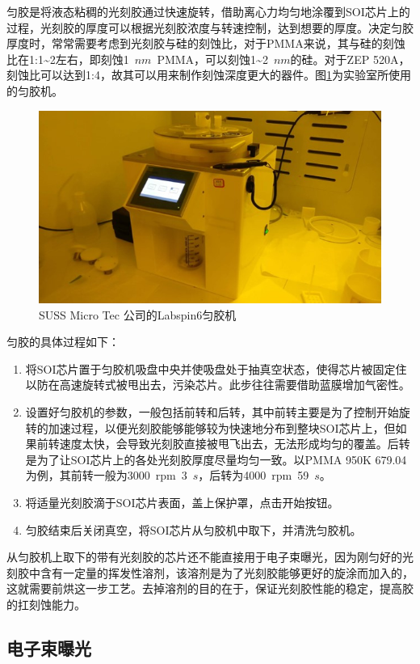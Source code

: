 匀胶是将液态粘稠的光刻胶通过快速旋转，借助离心力均匀地涂覆到SOI芯片上的过程，光刻胶的厚度可以根据光刻胶浓度与转速控制，达到想要的厚度。决定匀胶厚度时，常常需要考虑到光刻胶与硅的刻蚀比，对于PMMA来说，其与硅的刻蚀比在1:1\~{}2左右，即刻蚀1~$nm$~PMMA，可以刻蚀1\~{}2~$nm$的硅。对于ZEP 520A，刻蚀比可以达到1:4，故其可以用来制作刻蚀深度更大的器件。图\ref{fab_spinner}为实验室所使用的匀胶机。

\begin{figure}[htb]
	\centering
	\includegraphics[width=12cm]{./Pictures/fab_spinner.jpg}
	\captionsetup{justification=centering}
	\caption{SUSS Micro Tec 公司的Labspin6匀胶机}
	\label{fab_spinner}
\end{figure}
匀胶的具体过程如下：
\begin{enumerate}
	\item 
	将SOI芯片置于匀胶机吸盘中央并使吸盘处于抽真空状态，使得芯片被固定住以防在高速旋转式被甩出去，污染芯片。此步往往需要借助蓝膜增加气密性。
	\item 
	设置好匀胶机的参数，一般包括前转和后转，其中前转主要是为了控制开始旋转的加速过程，以便光刻胶能够能够较为快速地分布到整块SOI芯片上，但如果前转速度太快，会导致光刻胶直接被甩飞出去，无法形成均匀的覆盖。后转是为了让SOI芯片上的各处光刻胶厚度尽量均匀一致。以PMMA 950K 679.04为例，其前转一般为3000~rpm~3~$s$，后转为4000~rpm~59~$s$。
	\item 
	将适量光刻胶滴于SOI芯片表面，盖上保护罩，点击开始按钮。
	\item 
	匀胶结束后关闭真空，将SOI芯片从匀胶机中取下，并清洗匀胶机。
\end{enumerate}

从匀胶机上取下的带有光刻胶的芯片还不能直接用于电子束曝光，因为刚匀好的光刻胶中含有一定量的挥发性溶剂，该溶剂是为了光刻胶能够更好的旋涂而加入的，这就需要前烘这一步工艺。去掉溶剂的目的在于，保证光刻胶性能的稳定，提高胶的扛刻蚀能力。

\subsection{电子束曝光}

